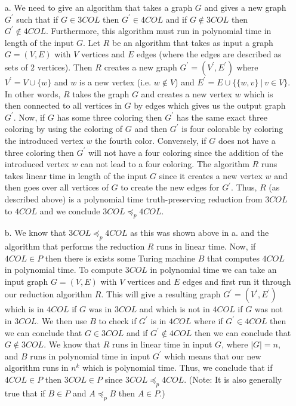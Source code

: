 \documentclass [10pt]{article}
\newcommand{\reduces}{\preceq}%
\begin{document}
\begin{enumerate}
\begin{enumerate}
		\item[a.]We need to give an algorithm that takes a graph $G$ and gives a new graph $G^{\prime}$ such that if $G\in3COL$ then $G^{\prime}\in4COL$ and if $G\notin 3COL$ then $G^{\prime}\notin 4COL$. Furthermore, this algorithm must run in polynomial time in length of the input $G$. Let $R$ be an algorithm that takes as input a graph $G=(V,E)$ with $V$ vertices and $E$ edges (where the edges are described as sets of $2$ vertices). Then $R$ creates a new graph $G^{\prime}=(V^{\prime},E^{\prime})$ where $V^{\prime}=V\cup \{w\}$ and $w$ is a new vertex (i.e. $w\notin V$) and $E^{\prime}=E\cup \{\{w,v\}\:|\:v\in V\}$. In other words, $R$ takes the graph $G$ and creates a new vertex $w$ which is then connected to all vertices in $G$ by edges which gives us the output graph $G^{\prime}$. Now, if $G$ has some three coloring then $G^{\prime}$ has the same exact three coloring by using the coloring of $G$ and then $G^{\prime}$ is four colorable by coloring the introduced vertex $w$ the fourth color. Conversely, if $G$ does not have a three coloring then $G^{\prime}$ will not have a four coloring since the addition of the introduced vertex $w$ can not lead to a four coloring. The algorithm $R$ runs takes linear time in length of the input $G$ since it creates a new vertex $w$ and then goes over all vertices of $G$ to create the new edges for $G^{\prime}$. Thus, $R$ (as described above) is a polynomial time truth-preserving reduction from $3COL$ to $4COL$ and we conclude $3COL\reduces_{p}4COL$.
		\item[b.]We know that $3COL\reduces_{p}4COL$ as this was shown above in a. and the algorithm that performs the reduction $R$ runs in linear time. Now, if $4COL\in P$ then there is exists some Turing machine $B$ that computes $4COL$ in polynomial time. To compute $3COL$ in polynomial time we can take an input graph $G=(V,E)$ with $V$ vertices and $E$ edges and first run it through our reduction algorithm $R$. This will give a resulting graph $G^{\prime}=(V^{\prime},E^{\prime})$ which is in $4COL$ if $G$ was in $3COL$ and which is not in $4COL$ if $G$ was not in $3COL$. We then use $B$ to check if $G^{\prime}$ is in $4COL$ where if $G^{\prime}\in4COL$ then we can conclude that $G\in3COL$ and if $G^{\prime}\notin4COL$ then we can conclude that $G\notin3COL$. We know that $R$ runs in linear time in input $G$, where $\left|G\right|=n$, and $B$ runs in polynomial time in input $G^{\prime}$ which means that our new algorithm runs in $n^{k}$ which is polynomial time. Thus, we conclude that if $4COL\in P$ then $3COL\in P$ since $3COL\reduces_{p}4COL$. (Note: It is also generally true that if $B\in P$ and $A\reduces_{p}B$ then $A\in P$.)

\end{enumerate}
\end{enumerate}
\end{document}
